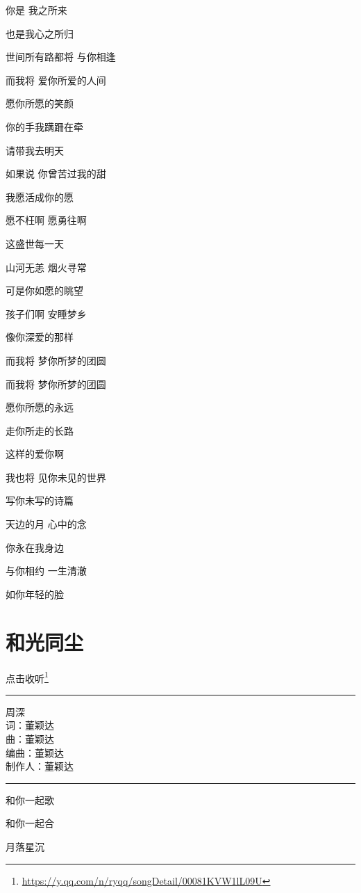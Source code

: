 \documentclass[]{ctexbook}
\renewcommand{\href}[2]{#2\footnote{\url{#1}}}
\begin{document}
你是 我之所来

也是我心之所归

世间所有路都将 与你相逢

而我将 爱你所爱的人间

愿你所愿的笑颜

你的手我蹒跚在牵

请带我去明天

如果说 你曾苦过我的甜

我愿活成你的愿

愿不枉啊 愿勇往啊

这盛世每一天

山河无恙 烟火寻常

可是你如愿的眺望

孩子们啊 安睡梦乡

像你深爱的那样

而我将 梦你所梦的团圆

而我将 梦你所梦的团圆

愿你所愿的永远

走你所走的长路

这样的爱你啊

我也将 见你未见的世界

写你未写的诗篇

天边的月 心中的念

你永在我身边

与你相约 一生清澈

如你年轻的脸

\section*{和光同尘}\label{stay-with-light}


\href{https://y.qq.com/n/ryqq/songDetail/00081KVW1lL09U}{点击收听}

\begin{center}\rule{0.5\linewidth}{0.5pt}\end{center}

周深\\
词：董颖达\\
曲：董颖达\\
编曲：董颖达\\
制作人：董颖达

\begin{center}\rule{0.5\linewidth}{0.5pt}\end{center}

和你一起歌

和你一起合

月落星沉
\end{document}
